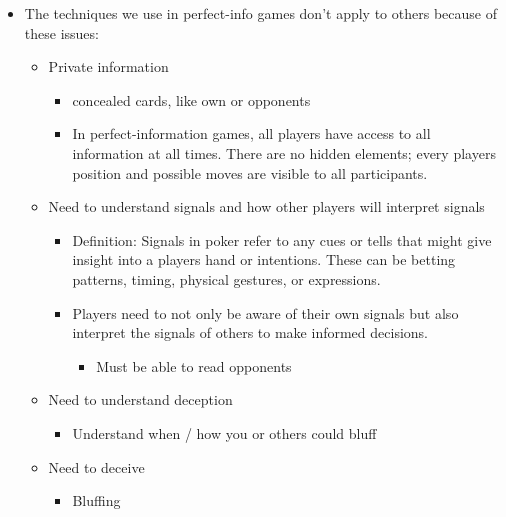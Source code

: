 \documentclass[
]{article}
\begin{document}
\begin{itemize}
  \begin{itemize}
  \item
    Checkers
  \item
    Chess
  \item
    Go
  \end{itemize}
\item
  The techniques we use in perfect-info games don't apply to others
  because of these issues:

  \begin{itemize}
  \item
    Private information

    \begin{itemize}
    \item
      concealed cards, like own or opponents
    \item
      In perfect-information games, all players have access to all
      information at all times. There are no hidden elements; every
      player\textquotesingle s position and possible moves are visible
      to all participants.
    \end{itemize}
  \item
    Need to understand signals and how other players will interpret
    signals

    \begin{itemize}
    \item
      Definition: Signals in poker refer to any cues or tells that might
      give insight into a player\textquotesingle s hand or intentions.
      These can be betting patterns, timing, physical gestures, or
      expressions.
    \item
      Players need to not only be aware of their own signals but also
      interpret the signals of others to make informed decisions.

      \begin{itemize}
      \item
        Must be able to read opponents
      \end{itemize}
    \end{itemize}
  \item
    Need to understand deception

    \begin{itemize}
    \item
      Understand when / how you or others could bluff
    \end{itemize}
  \item
    Need to deceive

    \begin{itemize}
    \item
      Bluffing


\end{itemize}
\end{itemize}
\end{itemize}
\end{document}
